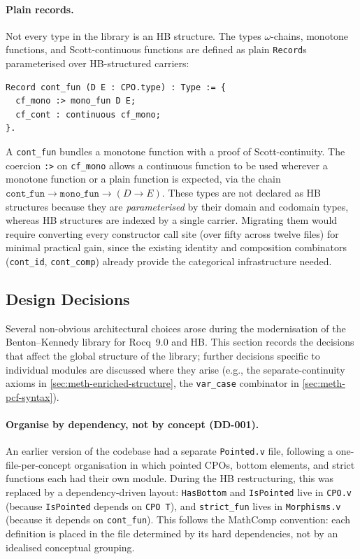 \paragraph{Plain records.}
Not every type in the library is an HB structure.  The types
$\omega$-chains, monotone functions, and Scott-continuous functions are
defined as plain \texttt{Record}s parameterised over HB-structured
carriers:

\begin{lstlisting}[caption={The \texttt{cont\_fun} record.},
                    label={lst:contfun}]
Record cont_fun (D E : CPO.type) : Type := {
  cf_mono :> mono_fun D E;
  cf_cont : continuous cf_mono;
}.
\end{lstlisting}

\noindent
A \texttt{cont\_fun} bundles a monotone function with a proof of
Scott-continuity.  The coercion \lstinline{:>} on \texttt{cf\_mono}
allows a continuous function to be used wherever a monotone function or
a plain function is expected, via the chain
$\texttt{cont\_fun} \to \texttt{mono\_fun} \to (D \to E)$.
These types are not declared as HB structures because they are
\emph{parameterised} by their domain and codomain types, whereas HB
structures are indexed by a single carrier.  Migrating them would require
converting every constructor call site (over fifty across twelve files)
for minimal practical gain, since the existing identity and composition
combinators (\texttt{cont\_id}, \texttt{cont\_comp}) already provide the
categorical infrastructure needed.


\subsection{Design Decisions}
\label{sec:meth-design-decisions}

Several non-obvious architectural choices arose during the modernisation
of the Benton--Kennedy library for Rocq~9.0 and HB.  This section records
the decisions that affect the global structure of the library; further
decisions specific to individual modules are discussed where they arise
(e.g., the separate-continuity axioms in \cref{sec:meth-enriched-structure},
the \texttt{var\_case} combinator in \cref{sec:meth-pcf-syntax}).

\paragraph{Organise by dependency, not by concept (DD-001).}
An earlier version of the codebase had a separate \texttt{Pointed.v}
file, following a one-file-per-concept organisation in which pointed
CPOs, bottom elements, and strict functions each had their own module.
During the HB restructuring, this was replaced by a dependency-driven
layout: \texttt{HasBottom} and \texttt{IsPointed} live in
\texttt{CPO.v} (because \texttt{IsPointed} depends on \texttt{CPO~T}),
and \texttt{strict\_fun} lives in \texttt{Morphisms.v} (because it
depends on \texttt{cont\_fun}).  This follows the MathComp convention:
each definition is placed in the file determined by its hard
dependencies, not by an idealised conceptual grouping.

